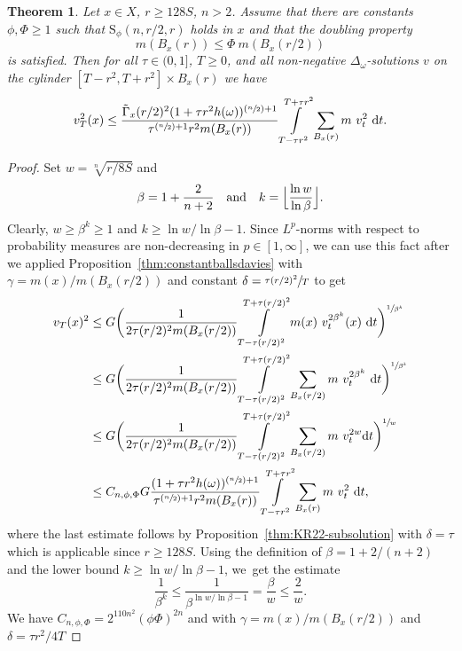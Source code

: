 \documentclass[10pt]{amsart}
\newcommand{\Psfrac}[2]{(\sfrac{#1}{#2})}
\newcommand{\rS}{\mathrm{S}}
\theoremstyle{plain}
\newtheorem{theorem}{Theorem}[section]
\theoremstyle{definition}
\newcommand{\drm}{\mathrm{d}}
\let\oldint\int
\renewcommand{\int}{\oldint\limits}
\begin{document}
\begin{theorem}\label{thm:l2meanvaluesturm} Let $ x\in X $, $r\geq
128 S$, $n>2$.
Assume that there are constants $\phi,\Phi\geq 1$ such that $\rS_{\phi}(n,r/2,r)$ holds in $ x $ and that the doubling property
\[
m(B_x(r))\leq \Phi\ m(B_x(r/2))
\]
is satisfied. Then for all $\tau\in(0,1]$, $T\geq 0$,
and all non-negative $\Delta_\omega$-solutions $v$ on the cylinder $[T-r^2,T+r^2]\times B_x(r)$ we have
\begin{align*}
v^2 _T(x)
\leq
\frac{\tilde\Gamma_x(r/2)^2(1+\tau r^2h(\omega))^{\Psfrac{n}{2}+1}}
{\tau^{\Psfrac{n}{2}+1}r^{2}m(B_x(r))}
\int\limits_{T-\tau r^2}^{T+ \tau r^2}\sum_{B_x(r)} m\ v_t^{2}\ \drm t.
\end{align*}
\end{theorem}
\begin{proof} Set {$w=\sqrt[n]{r/8S}$} and
\[
\beta=1+\frac{2}{n+2}\quad\text{and}\quad k=\Bigl\lfloor \frac{\ln w}{\ln \beta} \Bigr\rfloor.
\]
Clearly, $w\geq \beta^k{\ge1}$ and $k\geq \ln w/\ln \beta -1$.
Since $L^p$-norms with respect to probability measures are non-decreasing in $p\in[1,\infty]$,
we can use this fact after we applied Proposition~\ref{thm:constantballsdavies} with $\gamma=m(x)/m(B_x(r/2))$ and constant $\delta=\sfrac{\tau(r/2)^2}{T}$ to get
\begin{align*} v_T(x)^2
&\le G\biggl(\frac{1}{2 \tau(r/2)^2m(B_x(r/2))}\int\limits_{T- \tau (r/2)^2}^{T+ \tau (r/2)^2} m(x)\ v_t^{2\beta^{k}}(x)\ \drm t\biggr)^{\sfrac{1}{\beta^{k}}}
\\
&\le G\biggl(\frac{1}{2\tau (r/2)^2m(B_x(r/2))}\int\limits_{T- \tau (r/2)^2}^{T+ \tau (r/2)^2}\sum_{B_x( r/2)} m\ v_t^{2\beta^{k}}\ \drm t\biggr)^{\sfrac{1}{\beta^{k}}}
\\
&\leq G\biggl(\frac{1}{2\tau (r/2)^2m(B_x(r/2))}\int\limits_{T-\tau (r/2)^2}^{T+\tau (r/2)^2}\sum_{B_x( r/2)} m \ v_t^{2w}\drm t\biggr)^{\sfrac{1}{w}}\\
&\leq
C_{n,\phi,\Phi}G\frac{(1+\tau r^2h(\omega))^{\Psfrac{n}{2}+1}}
{\tau^{\Psfrac{n}{2}+1}r^{2}m(B_x(r))}
\int\limits_{T-\tau r^2}^{T+ \tau r^2}\sum_{B_x(r)} m\ v_t^{2}\ \drm t,
\end{align*}
where the last estimate follows by Proposition~\ref{thm:KR22-subsolution} with $\delta=\tau$ which is applicable since $r\ge 128S $. Using the definition of $\beta=1+2/(n+2)$ and the lower bound $k\geq \ln w/\ln \beta -1$, we~get the estimate
\[
\frac{1}{\beta^k}\leq \frac{1}{\beta^{\ln w/\ln \beta-1}}=\frac{\beta}{w}\leq \frac{2}{w}.
\]
We have $C_{n,\phi,\Phi}=2^{{110}n^2}(\phi\Phi)^{2n}$ and {with $ \gamma= m(x)/m(B_x(r/2))$ and $ \delta=\tau r^2 /4T $}

\end{proof}
\end{document}
